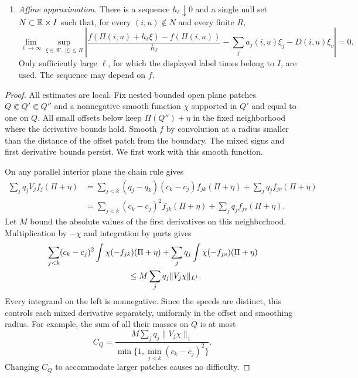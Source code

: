 \begin{theorem}
\begin{enumerate}
\item \emph{Affine approximation.} There is a sequence $h_\ell\downarrow0$ and a single null set
$N\subset\mathbb R\times I$ such that, for every $(i,u)\notin N$ and every
finite $R$,
\begin{equation}\label{eq:trace-affine-blowup}
 \lim_{\ell\to\infty}\sup_{\xi\in\mathcal K,\ |\xi|\le R}
 \left|
 \frac{f(\Pi(i,u)+h_\ell\xi)-f(\Pi(i,u))}{h_\ell}
      -\sum_j a_j(i,u)\xi_j-D(i,u)\xi_v
 \right|=0.
\end{equation}
Only sufficiently large $\ell$, for which the displayed label times
belong to $I$, are used.  The sequence may depend on $f$.
\end{enumerate}
\end{theorem}

\begin{proof}
All estimates are local.  Fix nested bounded open plane patches
$Q\Subset Q'\Subset Q''$ and a nonnegative smooth function $\chi$
supported in $Q'$ and equal to one on $Q$.  All small offsets below keep
$\Pi(Q'')+\eta$ in the fixed neighborhood where the derivative bounds
hold.  Smooth $f$ by convolution at a radius smaller than the distance
of the offset patch from the boundary.  The mixed signs and first
 derivative bounds persist.  We first work with this smooth function.

On any parallel interior plane the chain rule gives
\begin{equation}\label{eq:trace-smooth-flux}
 \begin{split}
 \sum_jq_jV_j f_j(\Pi+\eta)
 &=\sum_{j<k}(q_j-q_k)(c_k-c_j)f_{jk}(\Pi+\eta)
       +\sum_jq_jf_{jv}(\Pi+\eta)\\
 &=\sum_{j<k}(c_k-c_j)^2f_{jk}(\Pi+\eta)
       +\sum_jq_jf_{jv}(\Pi+\eta).
 \end{split}
\end{equation}
Let $M$ bound the absolute values of the first derivatives on this
neighborhood.  Multiplication by $-\chi$ and integration by parts gives
\begin{equation}\label{eq:trace-flux-bound}
 \begin{split}
 &\sum_{j<k}(c_k-c_j)^2
    \int\chi(-f_{jk})(\Pi+\eta)
       +\sum_jq_j\int\chi(-f_{jv})(\Pi+\eta)\\
 &\hspace{35mm}\le M\sum_jq_j\|V_j\chi\|_{L^1}.
 \end{split}
\end{equation}
Every integrand on the left is nonnegative.  Since the speeds are
distinct, this controls each mixed derivative separately, uniformly in
the offset and smoothing radius.  For example, the sum of all their
masses on $Q$ is at most
\[
 C_Q=\frac{M\sum_jq_j\|V_j\chi\|_1}
 {\min\{1,\min_{j<k}(c_k-c_j)^2\}}.
\]
Changing $C_Q$ to accommodate larger patches causes no difficulty.


\end{proof}
